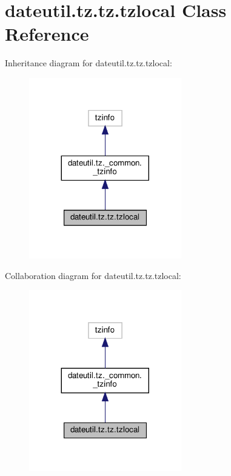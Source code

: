 \hypertarget{classdateutil_1_1tz_1_1tz_1_1tzlocal}{}\section{dateutil.\+tz.\+tz.\+tzlocal Class Reference}
\label{classdateutil_1_1tz_1_1tz_1_1tzlocal}


Inheritance diagram for dateutil.\+tz.\+tz.\+tzlocal\+:
\nopagebreak
\begin{figure}[H]
\begin{center}
\leavevmode
\includegraphics[width=188pt]{classdateutil_1_1tz_1_1tz_1_1tzlocal__inherit__graph}
\end{center}
\end{figure}


Collaboration diagram for dateutil.\+tz.\+tz.\+tzlocal\+:
\nopagebreak
\begin{figure}[H]
\begin{center}
\leavevmode
\includegraphics[width=188pt]{classdateutil_1_1tz_1_1tz_1_1tzlocal__coll__graph}
\end{center}
\end{figure}
